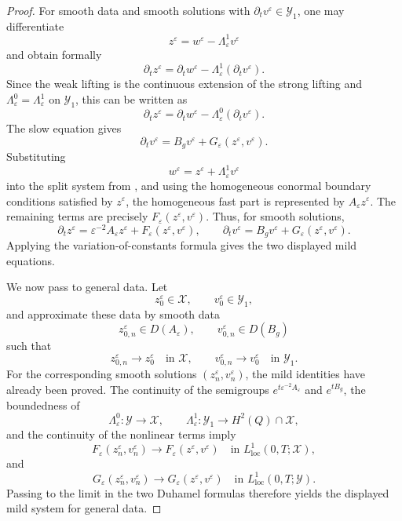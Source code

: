 \documentclass[11pt]{article}
\theoremstyle{definition}
\theoremstyle{remark}
\numberwithin{equation}{section}
\newcommand{\mc}[1]{\mathcal{#1}}
\begin{document}
\begin{proof}
For smooth data and smooth solutions  with \(\partial_t v^\varepsilon\in\mc Y_1\), one may differentiate
\[
z^\varepsilon=w^\varepsilon-\Lambda_\varepsilon^1v^\varepsilon
\]
and obtain formally
\[
\partial_tz^\varepsilon
=
\partial_tw^\varepsilon
-
\Lambda_\varepsilon^1(\partial_tv^\varepsilon).
\]
Since the weak lifting is the continuous extension of the strong lifting and
\(\Lambda_\varepsilon^0=\Lambda_\varepsilon^1\) on \(\mc Y_1\), this can be
written as
\[
\partial_tz^\varepsilon
=
\partial_tw^\varepsilon
-
\Lambda_\varepsilon^0(\partial_tv^\varepsilon).
\]
The slow equation gives
\[
\partial_tv^\varepsilon
=
B_gv^\varepsilon+G_\varepsilon(z^\varepsilon,v^\varepsilon).
\]
Substituting
\[
w^\varepsilon=z^\varepsilon+\Lambda_\varepsilon^1v^\varepsilon
\]
into the split system from , and using the homogeneous
conormal boundary conditions satisfied by \(z^\varepsilon\), the homogeneous
fast part is represented by \(A_\varepsilon z^\varepsilon\). The remaining
terms are precisely $F_\varepsilon(z^\varepsilon,v^\varepsilon)$.
Thus, for smooth solutions,
\[
\partial_t z^\varepsilon
=
\varepsilon^{-2}A_\varepsilon z^\varepsilon
+
F_\varepsilon(z^\varepsilon,v^\varepsilon),
\qquad
\partial_t v^\varepsilon
=
B_gv^\varepsilon
+
G_\varepsilon(z^\varepsilon,v^\varepsilon).
\]
Applying the variation-of-constants formula gives the two displayed mild
equations.

We now pass to general data. Let
\[
z_0^\varepsilon\in \mathcal X,
\qquad
v_0^\varepsilon\in \mathcal Y_1,
\]
and approximate these data by smooth data
\[
z_{0,n}^\varepsilon\in D(A_\varepsilon),
\qquad
v_{0,n}^\varepsilon\in D(B_g)
\]
such that
\[
z_{0,n}^\varepsilon\to z_0^\varepsilon
\quad\text{in }\mathcal X,
\qquad
v_{0,n}^\varepsilon\to v_0^\varepsilon
\quad\text{in }\mathcal Y_1 .
\]
For the corresponding smooth solutions
\((z_n^\varepsilon,v_n^\varepsilon)\), the mild identities have already been
proved. The continuity of the semigroups \(e^{t\varepsilon^{-2}A_\varepsilon}\) and \(e^{tB_g}\),
the boundedness of
\[
\Lambda_\varepsilon^0:\mathcal Y\to\mathcal X,
\qquad
\Lambda_\varepsilon^1:\mathcal Y_1\to H^2(Q)\cap\mathcal X,
\]
and the continuity of the nonlinear terms imply
\[
F_\varepsilon(z_n^\varepsilon,v_n^\varepsilon)
\to
F_\varepsilon(z^\varepsilon,v^\varepsilon)
\quad\text{in }L^1_{\mathrm{loc}}(0,T;\mathcal X),
\]
and
\[
G_\varepsilon(z_n^\varepsilon,v_n^\varepsilon)
\to
G_\varepsilon(z^\varepsilon,v^\varepsilon)
\quad\text{in }L^1_{\mathrm{loc}}(0,T;\mathcal Y).
\]
Passing to the limit in the two Duhamel formulas therefore yields the displayed
mild system for general data.
\end{proof}
\end{document}
